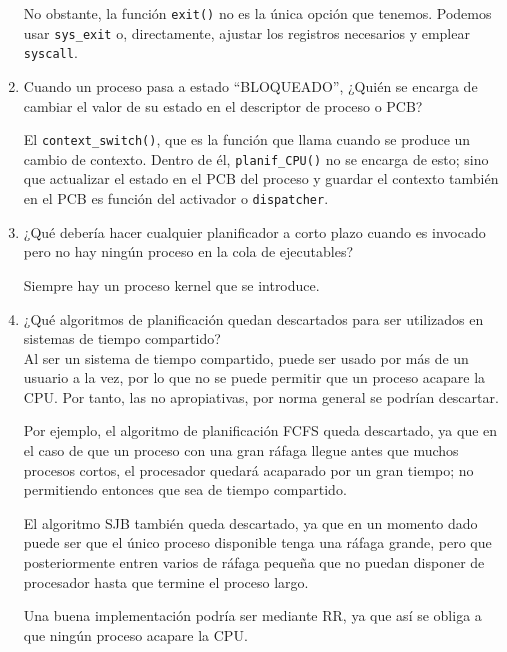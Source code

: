 \begin{ejercicio}
\begin{enumerate}
        No obstante, la función \verb|exit()| no es la única opción que tenemos. Podemos usar \verb|sys_exit| o, directamente, ajustar los registros necesarios y emplear \verb|syscall|.
        
        \item Cuando un proceso pasa a estado ``BLOQUEADO'', ¿Quién se encarga de cambiar el valor de su estado en el descriptor de proceso o PCB?

        El \verb|context_switch()|, que es la función que llama cuando se produce un cambio de contexto. Dentro de él, \verb|planif_CPU()| no se encarga de esto; sino que actualizar el estado en el PCB del proceso y guardar el contexto también en el PCB es función del activador o \verb|dispatcher|.
        
        \item ¿Qué debería hacer cualquier planificador a corto plazo cuando es invocado pero no hay ningún proceso en la cola de ejecutables?

        Siempre hay un proceso kernel que se introduce.

        
        \item ¿Qué algoritmos de planificación quedan descartados para ser utilizados en sistemas de tiempo compartido?\\

        Al ser un sistema de tiempo compartido, puede ser usado por más de un usuario a la vez, por lo que no se puede permitir que un proceso acapare la CPU. Por tanto, las no apropiativas, por norma general se podrían descartar.

        Por ejemplo, el algoritmo de planificación FCFS queda descartado, ya que en el caso de que un proceso con una gran ráfaga llegue antes que muchos procesos cortos, el procesador quedará acaparado por un gran tiempo; no permitiendo entonces que sea de tiempo compartido.

        El algoritmo SJB también queda descartado, ya que en un momento dado puede ser que el único proceso disponible tenga una ráfaga grande, pero que posteriormente entren varios de ráfaga pequeña que no puedan disponer de procesador hasta que termine el proceso largo.

        Una buena implementación podría ser mediante RR, ya que así se obliga a que ningún proceso acapare la CPU.
    \end{enumerate}
\end{ejercicio}


